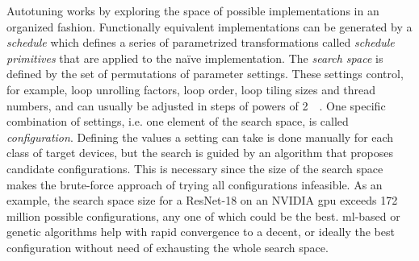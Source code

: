 Autotuning works by exploring the space of possible implementations in an organized fashion. Functionally equivalent implementations can be generated by a \textit{schedule} which defines a series of parametrized transformations called \textit{schedule primitives} that are applied to the naïve implementation. The \textit{search space} is defined by the set of permutations of parameter settings. These settings control, for example, loop unrolling factors, loop order, loop tiling sizes and thread numbers, and can usually be adjusted in steps of powers of 2~\cite[p.~5]{Chen.2018b}~\cite[p.~16]{Vasilache.2018}. One specific combination of settings, i.e. one element of the search space, is called \textit{configuration}. Defining the values a setting can take is done manually for each class of target devices, but the search is guided by an algorithm that proposes candidate configurations. This is necessary since the size of the search space makes the brute-force approach of trying all configurations infeasible. As an example, the search space size for a ResNet-18 on an NVIDIA \gls{gpu} exceeds 172 million possible configurations, any one of which could be the best. \Gls{ml}-based or genetic algorithms help with rapid convergence to a decent, or ideally the best configuration without need of exhausting the whole search space.


